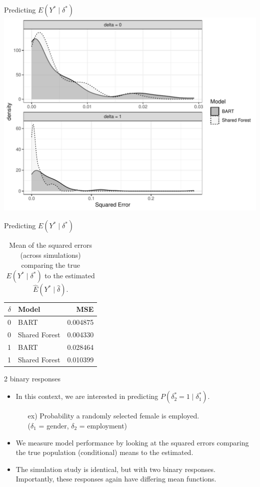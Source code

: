 \documentclass{beamer}
\begin{document}
\begin{frame}{Predicting $E(Y^* \mid \delta^*)$ }
\includegraphics[width = .9\linewidth]{continuous_sim_results.pdf}
\end{frame}

\begin{frame}{Predicting $E(Y^* \mid \delta^*)$ }

\begin{table}[ht]
\centering
\begin{tabular}{rlr}
  \hline
$\delta$ & Model & MSE\\
  \hline
0 & BART & 0.004875  \\ 
  0 & Shared Forest & 0.004330  \\ 
  1 & BART & 0.028464  \\ 
  1 & Shared Forest & 0.010399  \\ 
   \hline
\end{tabular}
\caption{\label{tab:mse} Mean of the squared errors (across simulations) comparing the true $E(Y^* \mid \delta^*)$ to the estimated $\hat{E}(Y^* \mid \hat{\delta})$.}
\end{table}

\end{frame}




\begin{frame}{2 binary responses}
\begin{itemize}
\item In this context, we are interested in predicting $P(\delta^*_2=1 \mid \delta^*_1)$.
\begin{itemize}
\item[ex)] Probability a randomly selected female is employed. \\($\delta_1$ = gender, $\delta_2$ = employment)
\end{itemize}
\item We measure model performance by looking at the squared errors comparing the true population (conditional) means to the estimated. 

\item The simulation study is identical, but with two binary responses. Importantly, these responses again have differing mean functions. 
\end{itemize}
\end{frame}
\end{document}
